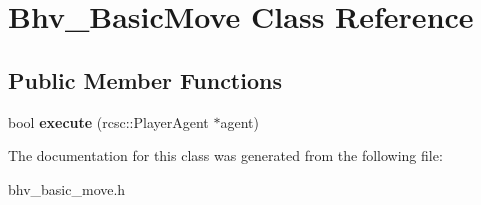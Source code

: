 \hypertarget{classBhv__BasicMove}{
\section{Bhv\_\-BasicMove Class Reference}
\label{classBhv__BasicMove}
}
\subsection*{Public Member Functions}
\begin{DoxyCompactItemize}
\item 
\hypertarget{classBhv__BasicMove_a513424e71465d7a3b26a187f5870bf14}{
bool {\bfseries execute} (rcsc::PlayerAgent $\ast$agent)}
\label{classBhv__BasicMove_a513424e71465d7a3b26a187f5870bf14}

\end{DoxyCompactItemize}


The documentation for this class was generated from the following file:\begin{DoxyCompactItemize}
\item 
bhv\_\-basic\_\-move.h\end{DoxyCompactItemize}
